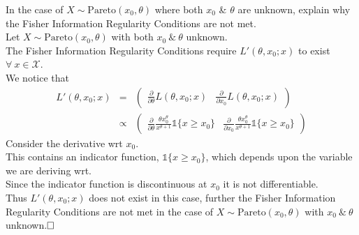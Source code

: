 \documentclass[11pt,a4paper]{article}
\begin{document}
\question
In the case of $X\sim\text{Pareto}(x_0,\theta)$ where both $x_0$ \& $\theta$ are unknown, explain why the Fisher Information Regularity Conditions are not met.\\

\ans
Let $X\sim\text{Pareto}(x_0,\theta)$ with both $x_0\ \&\ \theta$ unknown.\\
The Fisher Information Regularity Conditions require $L'(\theta,x_0;x)$ to exist $\forall\ x\in\mathcal{X}$.\\
We notice that
\[\begin{array}{rcl}
L'(\theta,x_0;x)&=&\begin{pmatrix}
\frac{\partial}{\partial \theta}L(\theta,x_0;x)&\frac{\partial}{\partial x_0}L(\theta,x_0;x)
\end{pmatrix}\\
&\propto&\begin{pmatrix}
\frac{\partial}{\partial \theta}\frac{\theta x_0^\theta}{x^{\theta+1}}\mathds{1}\{x\geq x_0\}&\frac{\partial}{\partial x_0}\frac{\theta x_0^\theta}{x^{\theta+1}}\mathds{1}\{x\geq x_0\}
\end{pmatrix}
\end{array}\]
Consider the derivative wrt $x_0$.\\
This contains an indicator function, $\mathds{1}\{x\geq x_0\}$, which depends upon the variable we are deriving wrt.\\
Since the indicator function is discontinuous at $x_0$ it is not differentiable.\\
Thus $L'(\theta,x_0;x)$ does not exist in this case, further the Fisher Information Regularity Conditions are not met in the case of $X\sim\text{Pareto}(x_0,\theta)$ with $x_0\ \&\ \theta$ unknown.$\hfill\square$
\end{document}
